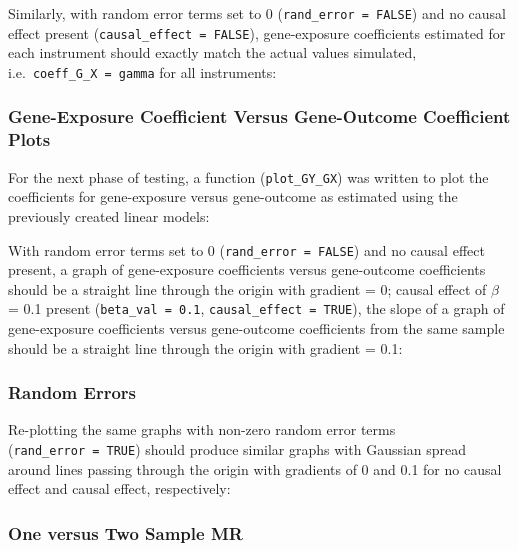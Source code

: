 \documentclass[
]{article}
\begin{document}
\newpage

Similarly, with random error terms set to 0 (\texttt{rand\_error\ =\ FALSE}) and no causal effect present (\texttt{causal\_effect\ =\ FALSE}), gene-exposure coefficients estimated for each instrument should exactly match the actual values simulated, i.e.~\texttt{coeff\_G\_X\ =\ gamma} for all instruments:

\newpage

\subsubsection{Gene-Exposure Coefficient Versus Gene-Outcome Coefficient Plots}\label{gene-exposure-coefficient-versus-gene-outcome-coefficient-plots}

\leavevmode\newline For the next phase of testing, a function (\texttt{plot\_GY\_GX}) was written to plot the coefficients for gene-exposure versus gene-outcome as estimated using the previously created linear models:

\newpage

With random error terms set to 0 (\texttt{rand\_error\ =\ FALSE}) and no causal effect present, a graph of gene-exposure coefficients versus gene-outcome coefficients should be a straight line through the origin with gradient = 0; causal effect of \(\beta\) = 0.1 present (\texttt{beta\_val\ =\ 0.1}, \texttt{causal\_effect\ =\ TRUE}), the slope of a graph of gene-exposure coefficients versus gene-outcome coefficients from the same sample should be a straight line through the origin with gradient = 0.1:

\newpage

\subsubsection{Random Errors}\label{random-errors}

\leavevmode\newline Re-plotting the same graphs with non-zero random error terms (\texttt{rand\_error\ =\ TRUE}) should produce similar graphs with Gaussian spread around lines passing through the origin with gradients of 0 and 0.1 for no causal effect and causal effect, respectively:

\newpage

\subsubsection{One versus Two Sample MR}\label{one-versus-two-sample-mr}
\end{document}
